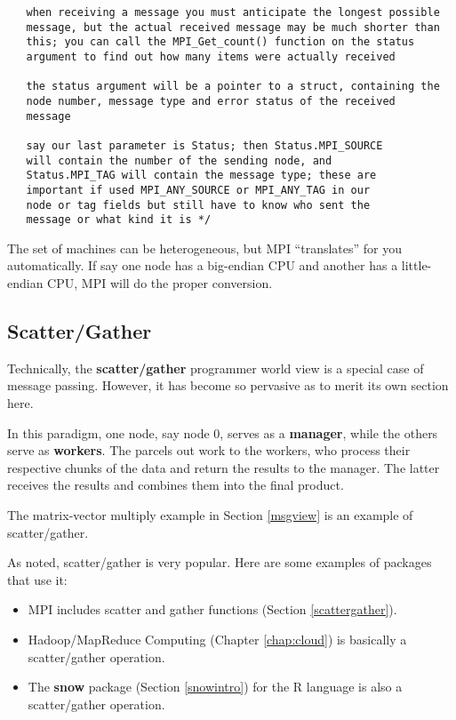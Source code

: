 \begin{Verbatim}
   when receiving a message you must anticipate the longest possible
   message, but the actual received message may be much shorter than
   this; you can call the MPI_Get_count() function on the status
   argument to find out how many items were actually received

   the status argument will be a pointer to a struct, containing the
   node number, message type and error status of the received
   message

   say our last parameter is Status; then Status.MPI_SOURCE
   will contain the number of the sending node, and
   Status.MPI_TAG will contain the message type; these are
   important if used MPI_ANY_SOURCE or MPI_ANY_TAG in our
   node or tag fields but still have to know who sent the
   message or what kind it is */
\end{Verbatim}

The set of machines can be heterogeneous, but MPI ``translates'' for you
automatically.  If say one node has a big-endian CPU and another has a
little-endian CPU, MPI will do the proper conversion.

\subsection{Scatter/Gather}

Technically, the {\bf scatter/gather} programmer world view is a special
case of message passing.  However, it has become so pervasive as to
merit its own section here.

In this paradigm, one node, say node 0, serves as a {\bf manager}, while
the others serve as {\bf workers}.  The parcels out work to the workers,
who process their respective chunks of the data and return the results
to the manager.  The latter receives the results and combines them into
the final product.

The matrix-vector multiply example in Section \ref{msgview} is an
example of scatter/gather.

As noted, scatter/gather is very popular.  Here are some examples of
packages that use it:

\begin{itemize}

\item MPI includes scatter and gather functions (Section
\ref{scattergather}).

\item Hadoop/MapReduce Computing (Chapter \ref{chap:cloud}) is basically a
scatter/gather operation.

\item The {\bf snow} package (Section \ref{snowintro}) for
the  R language is also a scatter/gather operation.

\end{itemize}

